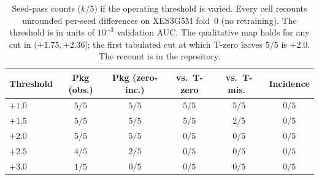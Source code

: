 \begin{table}[H]
\caption{Seed-pass counts ($k/5$) if the operating threshold is varied.
Every cell recounts unrounded per-seed differences on XES3G5M fold~0
(no retraining). The threshold is in units of $10^{-3}$ validation AUC.
The qualitative map holds for any cut in $(+1.75,+2.36]$; the first
tabulated cut at which T-zero leaves $5/5$ is $+2.0$. The recount is
in the repository.}
\label{tab:threshold-sensitivity}
\centering
\footnotesize
\setlength{\tabcolsep}{3.5pt}
\begin{tabular}{@{}lccccc@{}}
\toprule
Threshold & Pkg (obs.) & Pkg (zero-inc.) & vs.\ T-zero & vs.\ T-mis.\ & Incidence \\
\midrule
$+1.0$ & $5/5$ & $5/5$ & $5/5$ & $5/5$ & $0/5$ \\
$+1.5$ & $5/5$ & $5/5$ & $5/5$ & $2/5$ & $0/5$ \\
$+2.0$ & $5/5$ & $5/5$ & $0/5$ & $0/5$ & $0/5$ \\
$+2.5$ & $4/5$ & $2/5$ & $0/5$ & $0/5$ & $0/5$ \\
$+3.0$ & $1/5$ & $0/5$ & $0/5$ & $0/5$ & $0/5$ \\
\bottomrule
\end{tabular}
\end{table}
